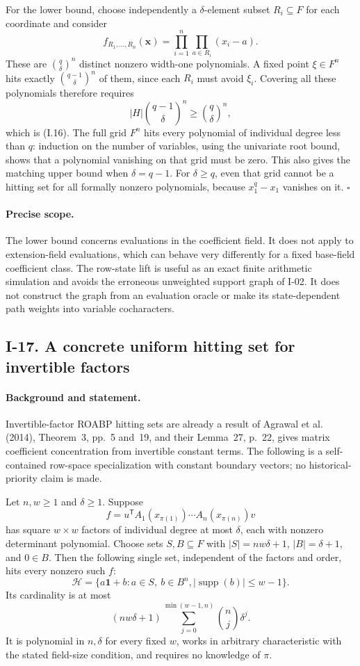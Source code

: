 \documentclass[11pt,a4paper]{article}
\theoremstyle{definition}\newtheorem{definition}{Definition}
\begin{document}
For the lower bound, choose independently a $\delta$-element subset
$R_i\subseteq F$ for each coordinate and consider
\[
 f_{R_1,\ldots,R_n}(\mathbf x)
     =\prod_{i=1}^n\prod_{a\in R_i}(x_i-a).
\]
These are $\binom{q}{\delta}^{n}$ distinct nonzero width-one polynomials.
A fixed point $\xi\in F^n$ hits exactly
$\binom{q-1}{\delta}^n$ of them, since each $R_i$ must avoid
$\xi_i$.  Covering all these polynomials therefore requires
\[
 |H|\binom{q-1}{\delta}^n\ge\binom{q}{\delta}^{n},
\]
which is (I.16).  The full grid $F^n$ hits every polynomial of
individual degree less than $q$: induction on the number of variables,
using the univariate root bound, shows that a polynomial vanishing
on that grid must be zero.  This also gives the matching upper bound
when $\delta=q-1$.  For $\delta\ge q$, even that grid cannot be a
hitting set for all formally nonzero polynomials, because
$x_1^q-x_1$ vanishes on it. \hfill$\square$

\paragraph{Precise scope.}
The lower bound concerns evaluations in the coefficient field.
It does not apply to extension-field evaluations, which can behave
very differently for a fixed base-field coefficient class.
The row-state lift is useful as an exact finite arithmetic simulation
and avoids the erroneous unweighted support graph of I-02.
It does not construct the graph from an evaluation oracle or make
its state-dependent path weights into variable cocharacters.

\subsection{I-17. A concrete uniform hitting set for invertible factors}
\label{I-17}

\paragraph{Background and statement.}
Invertible-factor ROABP hitting sets are already a result of
Agrawal et al. (2014), Theorem~3, pp.~5 and~19, and their
Lemma~27, p.~22, gives matrix coefficient concentration from
invertible constant terms.  The following is a self-contained
row-space specialization with constant boundary vectors; no
historical-priority claim is made.

Let $n,w\ge1$ and $\delta\ge1$.  Suppose
\[
 f=u^{\mathsf T}A_1(x_{\pi(1)})\cdots A_n(x_{\pi(n)})v
\]
has square $w\times w$ factors of individual degree at most
$\delta$, each with nonzero determinant polynomial.
Choose sets $S,B\subseteq F$ with
$|S|=nw\delta+1$, $|B|=\delta+1$, and $0\in B$.
Then the following single set, independent of the factors and order,
hits every nonzero such $f$:
\[
 \mathcal H=\{a\mathbf1+b: a\in S,\ b\in B^n,
                         |\operatorname{supp}(b)|\le w-1\}.
\tag{I.17}\label{eq:I-invertible-hit}
\]
Its cardinality is at most
\[
 (nw\delta+1)\sum_{j=0}^{\min(w-1,n)}\binom nj\delta^j.
\]
It is polynomial in $n,\delta$ for every fixed $w$, works in arbitrary
characteristic with the stated field-size condition, and requires
no knowledge of $\pi$.
\end{document}
